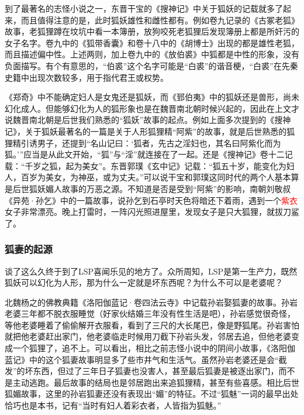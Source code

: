 \documentclass[UTF8, 12pt, A4paper]{article}
\begin{document}
到了最著名的志怪小说之一，东晋干宝的《搜神记》中关于狐妖的记载就多了起来，而且值得注意的是，此时狐妖雄性和雌性都有。例如卷九记录的《古冢老狐》故事，老狐狸蹲在坟坑中看一本簿册，放狗咬死老狐狸后发现簿册上都是所奸污的女子名字。卷九中的《狐带香囊》和卷十八中的《胡博士》出现的都是雄性老狐，而且描述偏中性。上述两则，加上卷九中的《放伯裘》中狐都是中性的形象，没有负面描写。有个有意思的，“伯裘”这个名字可能是“白裘”的谐音梗，“白裘”在先秦史籍中出现次数较多，用于指代君王或权势。

《郑奇》中不能确定妇人是女鬼还是狐妖，而《郅伯夷》中的狐妖还是兽形，尚未幻化成人。但能够幻化为人的狐形象也是在魏晋南北朝时候兴起的，因此在上文才说魏晋南北朝是后世我们熟悉的“狐妖”故事的起点。例如上面多次提到的《搜神记》，关于狐妖最著名的一篇是关于人形狐狸精“阿紫”的故事，就是后世熟悉的狐狸精引诱男子，还提到“名山记曰：‘狐者，先古之淫妇也，其名曰阿紫化而为狐。’”应当是从此文开始，“狐”与“淫”就连接在了一起。还是《搜神记》卷十二记载：“千岁之狐，起为美女”。东晋郭璞《玄中记》记载：“狐五十岁，能变化为妇人，百岁为美女，为神巫，或为丈夫。”可以说干宝和郭璞这同时代的两个人基本算是后世狐妖媚人故事的万恶之源。不知道是否是受到“阿紫”的影响，南朝刘敬叔《异苑·孙乞》中的一篇故事，说孙乞到石亭时天色将暗还下着雨，遇到一个\textcolor{red}{紫衣}女子非常漂亮。晚上打雷时，一阵闪光照进屋里，发现女子是只大狐狸，就拔刀鲨了。


\subsubsection{狐妻的起源}

谈了这么久终于到了LSP喜闻乐见的地方了。众所周知，LSP是第一生产力，既然狐妖可以幻化为人形，那为什么一定就是坏东西呢？为什么不可以是老婆呢？

北魏杨之的佛教典籍《洛阳伽蓝记·卷四法云寺》中记载孙岩娶狐妻的故事。孙岩老婆三年都不脱衣服睡觉（好家伙结婚三年没有性生活是吧），孙岩感觉很奇怪，等他老婆睡着了偷偷解开衣服看，看到了三尺的大长尾巴，像是野狐尾。孙岩害怕就把他老婆赶出家门，他老婆临走时候用刀截下孙岩头发，邻居去追，但他老婆变成一个狐狸了，追不上。可以看出，相比之前志怪小说中的阴间小故事，《洛阳伽蓝记》中的这个狐妻故事明显多了些市井气和生活气。虽然孙岩老婆还是会“截发”的坏东西，但过了三年日子狐妻也没害人，甚至最后狐妻是被逐出家门，而不是主动逃跑。最后故事的结局也是邻居跑出来追狐狸精，甚至有些喜感。相比后世狐媚故事，这里的孙岩狐妻还没有表现出“媚”的特征。不过“狐魅”一词的最早出处恰巧也是本书，记有“当时有妇人着彩衣者，人皆指为狐魅。”
\end{document}
